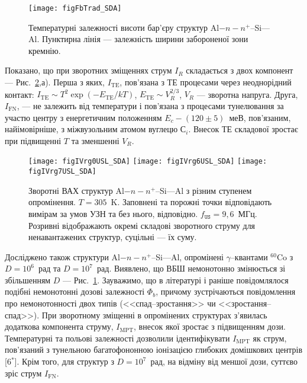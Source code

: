 \begin{figure}
\center
\texttt{[image: figFbTrad\_SDA]}
\caption{\label{figFbTrad_SDA}
Температурні залежності висоти бар'єру структур Al$-n-n^+$--Si---Al.
Пунктирна лінія --- залежність ширини забороненої зони кремнію.
}%
\end{figure}

Показано, що при зворотних зміщеннях струм $I_R$ складається з двох компонент --- Рис.~\ref{figIVrg0USL_SDA},а).
Перша з яких, $I_\mathrm{TE}$, пов'язана з ТЕ процесами через неоднорідний контакт:
$I_\mathrm{TE}\sim T^2\exp(-E_\mathrm{TE}/kT)$,
$E_\mathrm{TE}\sim V_R^{2/3}$,
$V_R$ --- зворотна напруга.
Друга, $I_\mathrm{FN}$, --- не залежить від температури і пов'язана з процесами тунелювання за участю
центру з енергетичним положенням $E_c-(120\pm5)$~меВ, пов'язаним, найімовірніше, з міжвузольним атомом вуглецю С$_i$.
Внесок ТЕ складової зростає при підвищенні $T$ та зменшенні $V_R$.

\begin{figure}[b]
\center
\texttt{[image: figIVrg0USL\_SDA]}\hfill
\texttt{[image: figIVrg6USL\_SDA]}\hfill
\texttt{[image: figIVrg7USL\_SDA]}
\caption{\label{figIVrg0USL_SDA}
Зворотні  ВАХ  структур Al$-n-n^+$--Si---Al з різним ступенем опромінення.
$T=305$~K.
Заповнені та порожні точки відповідають вимірам за умов УЗН та без нього, відповідно.
$f_\mathtt{US}=9,6$~МГц.
Розривні відображають окремі складові зворотного струму для ненавантажених структур,
суцільні --- їх суму.
}%
\end{figure}

Досліджено також структури Al$-n-n^+$--Si---Al, опромінені $\gamma$--квантами $^{60}$Co з $D=10^6$~рад та $D=10^7$~рад.
Виявлено, що ВБШ немонотонно змінюється зі збільшенням $D$ --- Рис.~\ref{figFbTrad_SDA}.
Зауважимо, що в літературі і раніше повідомлялося подібні немонотонні дозові залежності $\Phi_{b}$, причому зустрічаються повідомлення про немонотонності двох типів (<<спад--зростання>> чи <<зростання--спад>>).
При зворотному зміщенні в опромінених структурах з'явилась додаткова компонента струму, $I_\mathrm{MPT}$, внесок якої зростає з підвищенням дози.
Температурні та польові залежності дозволили ідентифікувати $I_\mathrm{MPT}$ як струм, пов'язаний з тунельною багатофононною іонізацією глибоких домішкових центрів
[6$^*$].
Крім того, для структур з $D=10^7$~рад, на відміну від меншої дози, суттєво зріс струм $I_\mathrm{FN}$.

